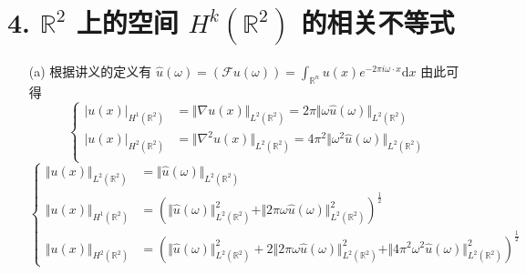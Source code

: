 \documentclass[a4paper]{article}
\begin{document}
\section*{4. $\mathbb{R}^2$ 上的空间 $H^k(\mathbb{R}^2)$ 的相关不等式}

\begin{enumerate}
    \item[(a)] 根据讲义的定义有 $\hat{u}(\omega)
                = (\mathscr{F}u(\omega))=\int_{\mathbb{R}^n}u(x)e^{-2\pi i \omega \cdot x }\text{d}x$
                由此可得
                \begin{equation}
                    \left\{
                    \begin{aligned}
                        |u(x)|_{H^1(\mathbb{R}^2)}
                        &= \Vert \nabla u(x) \Vert_{L^2(\mathbb{R}^2)}
                        = 2 \pi \Vert \omega\hat{u}(\omega) \Vert_{L^2(\mathbb{R}^2)}\\
                        |u(x)|_{H^2(\mathbb{R}^2)}
                        &= \Vert \nabla^2 u(x) \Vert_{L^2(\mathbb{R}^2)}
                        = 4 \pi^2 \Vert \omega^2\hat{u}(\omega) \Vert_{L^2(\mathbb{R}^2)}\\
                    \end{aligned}
                    \right.
                \end{equation}
                \begin{equation}
                    \left\{
                    \begin{aligned}
                        \Vert u(x) \Vert_{L^2(\mathbb{R}^2)} 
                        &= \Vert \hat{u}(\omega) \Vert_{L^2(\mathbb{R}^2)}\\
                        \Vert u(x) \Vert_{H^1(\mathbb{R}^2)}
                        &= \left(
                            \Vert \hat{u}(\omega) \Vert^2_{L^2(\mathbb{R}^2)}
                            + \Vert 2 \pi \omega\hat{u}(\omega) \Vert^2_{L^2(\mathbb{R}^2)}
                        \right)^{\frac{1}{2}}\\
                        \Vert u(x) \Vert_{H^2(\mathbb{R}^2)}
                        &= \left(
                            \Vert \hat{u}(\omega) \Vert^2_{L^2(\mathbb{R}^2)}
                            + 2\Vert 2 \pi \omega\hat{u}(\omega) \Vert^2_{L^2(\mathbb{R}^2)}
                            + \Vert 4 \pi^2 \omega^2\hat{u}(\omega) \Vert^2_{L^2(\mathbb{R}^2)}
                        \right)^{\frac{1}{2}}
                    \end{aligned}
                    \right.

\end{equation}
\end{enumerate}
\end{document}
